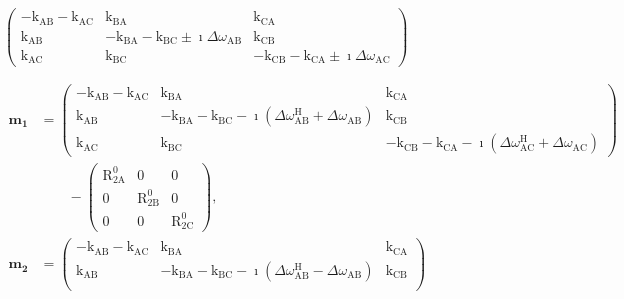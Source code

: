 \documentclass[a4paper,11pt,twoside,openright]{book}
\def\lthtmlcheckvsize{\ifdim\ht\sizebox<\vsize 
  \ifdim\wd\sizebox<\hsize\expandafter\hfill\fi \expandafter\vfill
  \else\expandafter\vss\fi}%
\begin{document}
{\newpage\clearpage
{}%
$\displaystyle \begin{pmatrix}
-\textrm{k}_{\textrm{AB}}-\textrm{k}_{\textrm{AC}}& \textrm{k}_{\textrm{BA}}& \textrm{k}_{\textrm{CA}}\\
\textrm{k}_{\textrm{AB}}& -\textrm{k}_{\textrm{BA}}-\textrm{k}_{\textrm{BC}}\pm\imath\Delta\omega_{\textrm{AB}}& \textrm{k}_{\textrm{CB}}\\
\textrm{k}_{\textrm{AC}}& \textrm{k}_{\textrm{BC}}& -\textrm{k}_{\textrm{CB}}-\textrm{k}_{\textrm{CA}}\pm\imath\Delta\omega_{\textrm{AC}}
\end{pmatrix}$%
\lthtmlindisplaymathZ
\lthtmlcheckvsize\clearpage}

{\newpage\clearpage
\setcounter{equation}{71}
%
\begin{subequations}\begin{align}
\mathbf{m_1} &= \begin{pmatrix}
-\textrm{k}_{\textrm{AB}}-\textrm{k}_{\textrm{AC}}& \textrm{k}_{\textrm{BA}}& \textrm{k}_{\textrm{CA}}\\
\textrm{k}_{\textrm{AB}}& -\textrm{k}_{\textrm{BA}}-\textrm{k}_{\textrm{BC}}-\imath(\Delta\omega^{\scriptscriptstyle\mathrm{H}}_{\textrm{AB}}+ \Delta\omega_{\textrm{AB}})   & \textrm{k}_{\textrm{CB}}\\
\textrm{k}_{\textrm{AC}}& \textrm{k}_{\textrm{BC}}& -\textrm{k}_{\textrm{CB}}-\textrm{k}_{\textrm{CA}}-\imath(\Delta\omega^{\scriptscriptstyle\mathrm{H}}_{\textrm{AC}}+ \Delta\omega_{\textrm{AC}})
\end{pmatrix}   \\
&\qquad - \begin{pmatrix}
\mathrm{R}_{\mathrm{2A}}^0& 0          & 0    \\
0          & \mathrm{R}_{\mathrm{2B}}^0& 0    \\
0          & 0          & \mathrm{R}_{\mathrm{2C}}^0
\end{pmatrix}, \\
\mathbf{m_2} &= \begin{pmatrix}
-\textrm{k}_{\textrm{AB}}-\textrm{k}_{\textrm{AC}}& \textrm{k}_{\textrm{BA}}& \textrm{k}_{\textrm{CA}}\\
\textrm{k}_{\textrm{AB}}& -\textrm{k}_{\textrm{BA}}-\textrm{k}_{\textrm{BC}}-\imath(\Delta\omega^{\scriptscriptstyle\mathrm{H}}_{\textrm{AB}}- \Delta\omega_{\textrm{AB}})   & \textrm{k}_{\textrm{CB}}\\

\end{pmatrix}
\end{align}
\end{subequations}}
\end{document}
